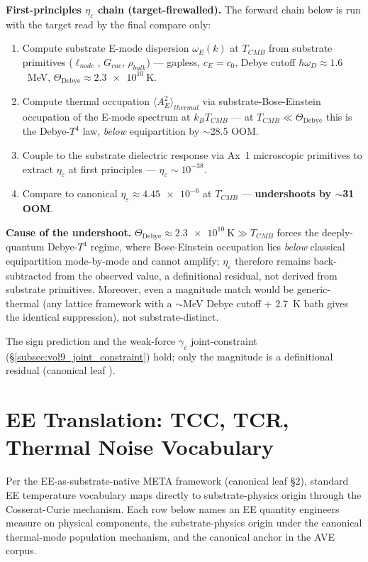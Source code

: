 \textbf{First-principles $\eta_\varepsilon$ chain (target-firewalled).} The forward chain below is run with the target read by the final compare only:
\begin{enumerate}
    \item Compute substrate E-mode dispersion $\omega_E(k)$ at $T_{CMB}$ from substrate primitives ($\ell_{node}$, $G_{vac}$, $\rho_{bulk}$) --- gapless, $c_E = c_0$, Debye cutoff $\hbar\omega_D \approx 1.6$~MeV, $\Theta_{\text{Debye}} \approx \qty{2.3e10}{\kelvin}$.
    \item Compute thermal occupation $\langle A_E^2 \rangle_{thermal}$ via substrate-Bose-Einstein occupation of the E-mode spectrum at $k_B T_{CMB}$ --- at $T_{CMB} \ll \Theta_{\text{Debye}}$ this is the Debye-$T^4$ law, \emph{below} equipartition by $\sim$28.5 OOM.
    \item Couple to the substrate dielectric response via Ax~1 microscopic primitives to extract $\eta_\varepsilon$ at first principles --- $\eta_\varepsilon \sim 10^{-38}$.
    \item Compare to canonical $\eta_\varepsilon \approx \num{4.45e-6}$ at $T_{CMB}$ --- \textbf{undershoots by $\sim$31 OOM}.
\end{enumerate}
\textbf{Cause of the undershoot.} $\Theta_{\text{Debye}} \approx \qty{2.3e10}{\kelvin} \gg T_{CMB}$ forces the deeply-quantum Debye-$T^4$ regime, where Bose-Einstein occupation lies \emph{below} classical equipartition mode-by-mode and cannot amplify; $\eta_\varepsilon$ therefore remains back-subtracted from the observed value, a definitional residual, not derived from substrate primitives. Moreover, even a magnitude match would be generic-thermal (any lattice framework with a $\sim$MeV Debye cutoff + 2.7~K bath gives the identical suppression), not substrate-distinct.

The sign prediction and the weak-force $\gamma_c$ joint-constraint (\S\ref{subsec:vol9_joint_constraint}) hold; only the magnitude is a definitional residual (canonical leaf ).

\section{EE Translation: TCC, TCR, Thermal Noise Vocabulary}
\label{sec:vol9_temperature_ee_translation}

Per the EE-as-substrate-native META framework (canonical leaf  \S 2), standard EE temperature vocabulary maps directly to substrate-physics origin through the Cosserat-Curie mechanism. Each row below names an EE quantity engineers measure on physical components, the substrate-physics origin under the canonical thermal-mode population mechanism, and the canonical anchor in the AVE corpus.

